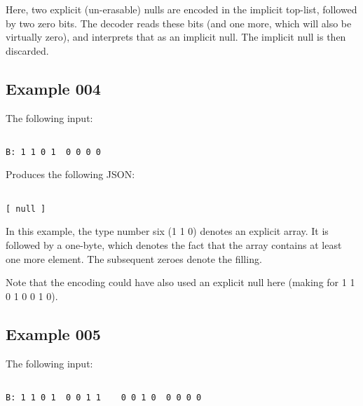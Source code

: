 Here, two explicit (un-erasable) nulls are encoded in the implicit
top-list, followed by two zero bits. The decoder reads these bits
(and one more, which will also be virtually zero), and interprets that
as an implicit null. The implicit null is then discarded.

\subsection{Example 004}

The following input:

\begin{changemargin}{-60mm}{0mm}
\begin{myquote}
\begin{verbatim}

B: 1 1 0 1  0 0 0 0

\end{verbatim}
\end{myquote}
\end{changemargin}

Produces the following JSON:

\begin{changemargin}{-60mm}{0mm}
\begin{myquote}
\begin{verbatim}

[ null ]

\end{verbatim}
\end{myquote}
\end{changemargin}

In this example, the type number six (1 1 0) denotes an explicit array.
It is followed by a one-byte, which denotes the fact that the array
contains at least one more element. The subsequent zeroes denote the filling.

Note that the encoding could have also used an explicit null here
(making for 1 1 0 1  0 0 1 0).

\subsection{Example 005}

The following input:

\begin{changemargin}{-60mm}{0mm}
\begin{myquote}
\begin{verbatim}

B: 1 1 0 1  0 0 1 1    0 0 1 0  0 0 0 0

\end{verbatim}
\end{myquote}
\end{changemargin}

